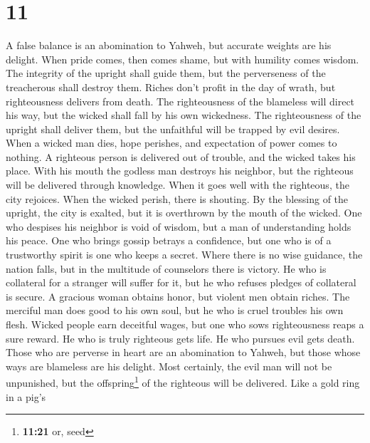 \hypertarget{section-10}{%
\section{11}\label{section-10}}

 A false balance is an abomination to Yahweh, but accurate
weights are his delight.  When pride comes, then comes
shame, but with humility comes wisdom.  The integrity of
the upright shall guide them, but the perverseness of the treacherous
shall destroy them.  Riches don't profit in the day of
wrath, but righteousness delivers from death.  The
righteousness of the blameless will direct his way, but the wicked shall
fall by his own wickedness.  The righteousness of the
upright shall deliver them, but the unfaithful will be trapped by evil
desires.  When a wicked man dies, hope perishes, and
expectation of power comes to nothing.  A righteous person
is delivered out of trouble, and the wicked takes his place.
 With his mouth the godless man destroys his neighbor, but
the righteous will be delivered through knowledge.  When
it goes well with the righteous, the city rejoices. When the wicked
perish, there is shouting.  By the blessing of the
upright, the city is exalted, but it is overthrown by the mouth of the
wicked.  One who despises his neighbor is void of wisdom,
but a man of understanding holds his peace.  One who
brings gossip betrays a confidence, but one who is of a trustworthy
spirit is one who keeps a secret.  Where there is no wise
guidance, the nation falls, but in the multitude of counselors there is
victory.  He who is collateral for a stranger will suffer
for it, but he who refuses pledges of collateral is secure.
 A gracious woman obtains honor, but violent men obtain
riches.  The merciful man does good to his own soul, but
he who is cruel troubles his own flesh.  Wicked people
earn deceitful wages, but one who sows righteousness reaps a sure
reward.  He who is truly righteous gets life. He who
pursues evil gets death.  Those who are perverse in heart
are an abomination to Yahweh, but those whose ways are blameless are his
delight.  Most certainly, the evil man will not be
unpunished, but the offspring\footnote{\textbf{11:21} or, seed} of the
righteous will be delivered.  Like a gold ring in a pig's
